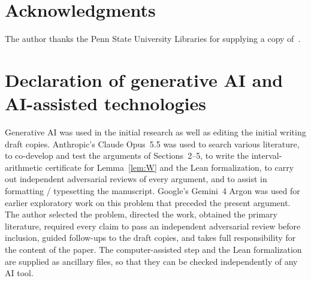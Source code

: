 \documentclass[11pt]{amsart}
\theoremstyle{remark}
\begin{document}
\section*{Acknowledgments}
The author thanks the Penn State University Libraries for supplying a copy of~\cite{Helm96b}.

\section*{Declaration of generative AI and AI-assisted technologies}
Generative AI was used in the initial research as well as editing the initial writing draft copies. Anthropic's Claude Opus~5.5 was used to search various literature, to co-develop and test the arguments of Sections~2--5, to write the interval-arithmetic certificate for Lemma~\ref{lem:W} and the Lean formalization, to carry out independent adversarial reviews of every argument, and to assist in formatting / typesetting the manuscript. Google's Gemini~4 Argon was used for earlier exploratory work on this problem that preceded the present argument. The author selected the problem, directed the work, obtained the primary literature, required every claim to pass an independent adversarial review before inclusion, guided follow-ups to the draft copies, and takes full responsibility for the content of the paper. The computer-assisted step and the Lean formalization are supplied as ancillary files, so that they can be checked independently of any AI tool.
\end{document}
